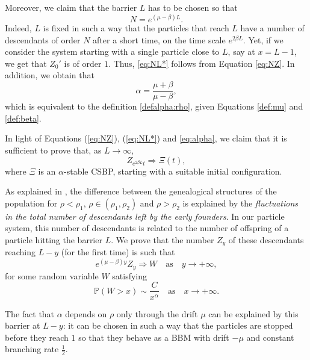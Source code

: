 \documentclass[11pt]{article}
\theoremstyle{plain}
\begin{document}
\bigskip
Moreover, we claim that the barrier $L$ has to be chosen so that 
\begin{equation}
\label{eq:NL*}N=e^{(\mu-\beta)L}.
\end{equation}
Indeed, $L$ is fixed in such a way that the particles that reach $L$ have a number of descendants of order $N$ after a short time, on the time scale $e^{2\beta L}$. Yet, if we consider the system starting with a single particle close to $L$, say at $x=L-1$, we get that $Z_0'$ is of order $1$. Thus, \eqref{eq:NL*} follows from Equation \eqref{eq:NZ}. In addition, we obtain that 
\begin{equation}
\alpha=\frac{\mu+\beta}{\mu-\beta}\label{eq:alpha},
\end{equation}
which is equivalent to the definition \eqref{defalpha:rho}, given Equations \eqref{def:mu} and \eqref{def:beta}. 

\bigskip

In light of Equations (\ref{eq:NZ}), (\ref{eq:NL*}) and \eqref{eq:alpha}, we claim that it is sufficient to prove that, as $L\to\infty$,
\begin{equation}
\label{eq:cvZ}
Z_{e^{2\beta L}t}\Rightarrow \Xi(t),
\end{equation}
where $\Xi$ is an $\alpha$-stable CSBP, 
starting with a suitable initial configuration.

\bigskip

As explained in \cite{Birzu:2020up}, the difference between the genealogical structures of the population for $\rho<\rho_1$, $\rho \in (\rho_1,\rho_2)$ and $\rho>\rho_2$ is explained by the \textit{fluctuations in the total number of descendants left by the early founders}. In our particle system, this number of descendants is related to the number of offspring of a particle hitting the barrier $L$. We  prove that the number $Z_y$ of these descendants reaching $L-y$ (for the first time) is such that 
\begin{equation*}
e^{(\mu-\beta)y}Z_y\Rightarrow W\quad \text{as} \quad y\to +\infty,
\end{equation*}   
for some random variable $W$ satisfying 
\begin{equation*}
\mathbb{P}(W>x)\sim \frac{C}{x^\alpha}\quad \text{as} \quad x\to +\infty.
\end{equation*}

The fact that $\alpha$ depends on $\rho$ only through the drift $\mu$ can be explained by this barrier at $L-y$:  it can be chosen in such a way that the particles are stopped before they reach $1$ so that they behave as  a BBM with drift $-\mu$ and constant branching rate $\frac{1}{2}$.
\end{document}
